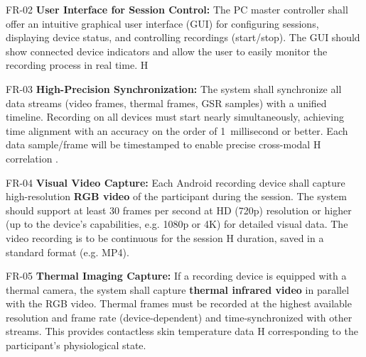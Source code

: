   FR-02                   \textbf{User Interface for Session Control:} The PC master controller shall offer an intuitive graphical user interface (GUI) for configuring sessions, displaying device status, and controlling recordings (start/stop). The GUI should show connected device indicators and allow the user to easily monitor the recording process in real time.                                     H

  FR-03                   \textbf{High-Precision Synchronization:} The system shall synchronize all data streams (video frames, thermal frames, GSR samples) with a unified timeline. Recording on all devices must start nearly simultaneously, achieving time alignment with an accuracy on the order of 1 millisecond or better. Each data sample/frame will be timestamped to enable precise cross-modal      H
                          correlation \cite{ref1}.                                                                                                                                                                                                                                  

  FR-04                   \textbf{Visual Video Capture:} Each Android recording device shall capture high-resolution \textbf{RGB video} of the participant during the session. The system should support at least 30 frames per second at HD (720p) resolution or higher (up to the device's capabilities, e.g. 1080p or 4K) for detailed visual data. The video recording is to be continuous for the session         H
                          duration, saved in a standard format (e.g. MP4).                                                                                                                                                                                                                                                                                                                                   

  FR-05                   \textbf{Thermal Imaging Capture:} If a recording device is equipped with a thermal camera, the system shall capture \textbf{thermal infrared video} in parallel with the RGB video. Thermal frames must be recorded at the highest available resolution and frame rate (device-dependent) and time-synchronized with other streams. This provides contactless skin temperature data          H
                          corresponding to the participant's physiological state.                                                                                                                                                                                                                                                                                                                            

